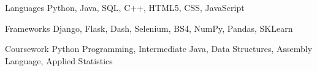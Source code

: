 
\begin{cvskills}
  \cvskill
    {Languages} %
    {Python, Java, SQL, C++, HTML5, CSS, JavaScript} %

  \cvskill
    {Frameworks} %
    {Django, Flask, Dash, Selenium, BS4, NumPy, Pandas, SKLearn} %
    
  \cvskill
    {Coursework} %
    {Python Programming, Intermediate Java, Data Structures, Assembly Language, Applied Statistics} %
\end{cvskills}
